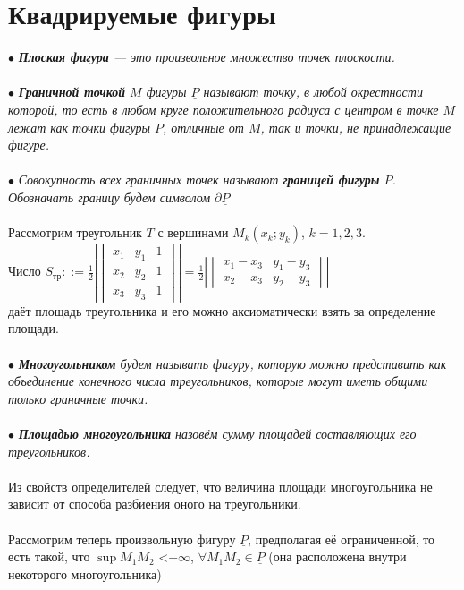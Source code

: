 \section{Квадрируемые фигуры}
$\bullet$ \textit{\textbf{Плоская фигура} --- это произвольное множество точек плоскости.}\\\\
$\bullet$ \textit{\textbf{Граничной точкой} $M$ фигуры $\underline{P}$ называют точку, в любой окрестности которой, то есть в любом круге положительного радиуса с центром в точке $M$ лежат как точки фигуры $P$, отличные от $M$, так и точки, не принадлежащие фигуре.}\\\\
$\bullet$ \textit{Совокупность всех граничных точек называют \textbf{границей фигуры} $P$.
	Обозначать границу будем символом $\partial \underline{P}$}\\\\
Рассмотрим треугольник $T$ с вершинами $M_k(x_k; y_k)$, $k = 1, 2, 3$.\\
Число $S_\text{тр}::=\frac12 \left|\begin{vmatrix}
	x_1& y_1 & 1\\
	x_2& y_2 & 1 \\
	x_3& y_3 & 1
\end{vmatrix}\right| = \frac12 \left|\begin{vmatrix}
	x_1 - x_3 & y_1 - y_3 \\
	x_2 - x_3 & y_2 - y_3
\end{vmatrix}\right|$ \\даёт площадь треугольника и его можно аксиоматически взять за определение площади.\\\\
$\bullet$ \textit{\textbf{Многоугольником} будем называть фигуру, которую можно представить как объединение конечного числа треугольников, которые могут иметь общими только граничные точки.}\\\\
$\bullet$ \textit{\textbf{Площадью многоугольника} назовём сумму площадей составляющих его треугольников.}\\\\
Из свойств определителей следует, что величина площади многоугольника не зависит от способа разбиения оного на треугольники.\\\\
Рассмотрим теперь произвольную фигуру $\underline{P}$, предполагая её ограниченной, то есть такой, что $\sup M_1 M_2 $ \textless $ +\infty$, $\forall M_1 M_2 \in \underline{P}$ (она расположена внутри некоторого многоугольника)\\\\
